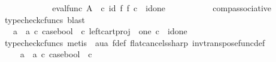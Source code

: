 \begin{isabellebody}
\ \ \ \ \ \ \ \isamarkupfalse%
\ \isamarkupfalse%
\ {\isachardoublequoteopen}{\isachardot}{\kern0pt}{\isachardot}{\kern0pt}{\isachardot}{\kern0pt}\ {\isacharequal}{\kern0pt}\ {\isacharparenleft}{\kern0pt}eval{\isacharunderscore}{\kern0pt}func\ A\ {\isasymOmega}\ {\isasymcirc}\isactrlsub c\ {\isacharparenleft}{\kern0pt}id{\isacharparenleft}{\kern0pt}{\isasymOmega}{\isacharparenright}{\kern0pt}\ {\isasymtimes}\isactrlsub f\ f{\isacharparenright}{\kern0pt}{\isacharparenright}{\kern0pt}\ {\isasymcirc}\isactrlsub c\ {\isasymlangle}{\isasymf}{\isacharcomma}{\kern0pt}\ id{\isacharparenleft}{\kern0pt}one{\isacharparenright}{\kern0pt}{\isasymrangle}{\isachardoublequoteclose}\isanewline
\ \ \ \ \ \ \ \ \ \isamarkupfalse%
\ comp{\isacharunderscore}{\kern0pt}associative{}\ \isamarkupfalse%
\ {\isacharparenleft}{\kern0pt}typecheck{\isacharunderscore}{\kern0pt}cfuncs{\isacharcomma}{\kern0pt}\ blast{\isacharparenright}{\kern0pt}\isanewline
\ \ \ \ \ \ \ \isamarkupfalse%
\ \isamarkupfalse%
\ {\isachardoublequoteopen}{\isachardot}{\kern0pt}{\isachardot}{\kern0pt}{\isachardot}{\kern0pt}\ {\isacharequal}{\kern0pt}\ {\isacharparenleft}{\kern0pt}{\isacharparenleft}{\kern0pt}a{}\ {\isasymamalg}\ a{}{\isacharparenright}{\kern0pt}\ {\isasymcirc}\isactrlsub c\ case{\isacharunderscore}{\kern0pt}bool\ \ {\isasymcirc}\isactrlsub c\ left{\isacharunderscore}{\kern0pt}cart{\isacharunderscore}{\kern0pt}proj\ {\isasymOmega}\ one{\isacharparenright}{\kern0pt}\ {\isasymcirc}\isactrlsub c\ {\isasymlangle}{\isasymf}{\isacharcomma}{\kern0pt}\ id{\isacharparenleft}{\kern0pt}one{\isacharparenright}{\kern0pt}{\isasymrangle}{\isachardoublequoteclose}\isanewline
\ \ \ \ \ \ \ \ \ \isamarkupfalse%
\ {\isacharparenleft}{\kern0pt}typecheck{\isacharunderscore}{\kern0pt}cfuncs{\isacharcomma}{\kern0pt}\ metis\ \ aua\ f{\isacharunderscore}{\kern0pt}def\ flat{\isacharunderscore}{\kern0pt}cancels{\isacharunderscore}{\kern0pt}sharp\ inv{\isacharunderscore}{\kern0pt}transpose{\isacharunderscore}{\kern0pt}func{\isacharunderscore}{\kern0pt}def{}{\isacharparenright}{\kern0pt}\isanewline
\ \ \ \ \ \ \ \isamarkupfalse%
\ \isamarkupfalse%
\ {\isachardoublequoteopen}{\isachardot}{\kern0pt}{\isachardot}{\kern0pt}{\isachardot}{\kern0pt}\ {\isacharequal}{\kern0pt}\ {\isacharparenleft}{\kern0pt}a{}\ {\isasymamalg}\ a{}{\isacharparenright}{\kern0pt}\ {\isasymcirc}\isactrlsub c\ case{\isacharunderscore}{\kern0pt}bool\ \ {\isasymcirc}\isactrlsub c\ {\isasymf}{\isachardoublequoteclose}\isanewline

\end{isabellebody}
